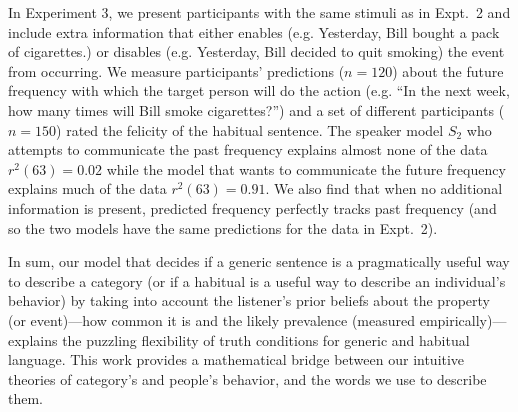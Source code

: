 \documentclass[11pt,letterpaper]{article}
\begin{document}
In Experiment 3, we present participants with the same stimuli as in Expt.~2 and include extra information that either enables (e.g. Yesterday, Bill bought a pack of cigarettes.) or disables (e.g. Yesterday, Bill decided to quit smoking) the event from occurring. 
We measure participants' predictions ($n=120$) about the future frequency with which the target person will do the action (e.g. ``In the next week, how many times will Bill smoke cigarettes?'') and a set of different participants ($n=150$) rated the felicity of the habitual sentence. 
The speaker model $S_2$ who attempts to communicate the past frequency explains almost none of the data $r^2(63)=0.02$ while the model that wants to communicate the future frequency explains much of the data $r^2(63)=0.91$.
We also find that when no additional information is present, predicted frequency perfectly tracks past frequency (and so the two models have the same predictions for the data in Expt.~2).

In sum, our model that decides if a generic sentence is a pragmatically useful way to describe a category (or if a habitual is a useful way to describe an individual's behavior) by taking into account the listener's prior beliefs about the property (or event)---how common it is and the likely prevalence (measured empirically)---explains the puzzling flexibility of truth conditions for generic and habitual language.
This work provides a mathematical bridge between our intuitive theories of category's and people's behavior, and the words we use to describe them.




\end{document}
